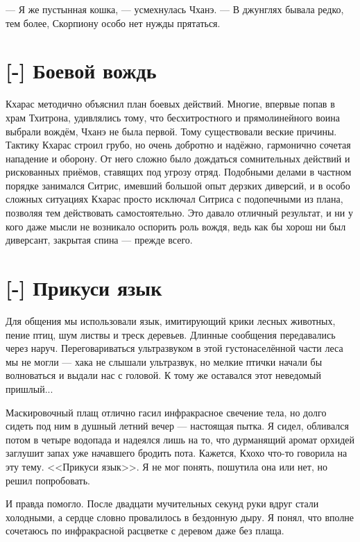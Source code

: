 --- Я же пустынная кошка, --- усмехнулась Чханэ.
--- В джунглях бывала редко, тем более, Скорпиону особо нет нужды прятаться.

\section{[-] Боевой вождь}

\textspace

Кхарас методично объяснил план боевых действий.
Многие, впервые попав в храм Тхитрона, удивлялись тому, что бесхитростного и прямолинейного воина выбрали вождём, Чханэ не была первой.
Тому существовали веские причины.
Тактику Кхарас строил грубо, но очень добротно и надёжно, гармонично сочетая нападение и оборону.
От него сложно было дождаться сомнительных действий и рискованных приёмов, ставящих под угрозу отряд.
Подобными делами в частном порядке занимался Ситрис, имевший большой опыт дерзких диверсий, и в особо сложных ситуациях Кхарас просто исключал Ситриса с подопечными из плана, позволяя тем действовать самостоятельно.
Это давало отличный результат, и ни у кого даже мысли не возникало оспорить роль вождя, ведь как бы хорош ни был диверсант, закрытая спина --- прежде всего.

\section{[-] Прикуси язык}

\textspace

Для общения мы использовали язык, имитирующий крики лесных животных, пение птиц, шум листвы и треск деревьев.
Длинные сообщения передавались через наруч.
Переговариваться ультразвуком в этой густонаселённой части леса мы не могли --- хака не слышали ультразвук, но мелкие птички начали бы волноваться и выдали нас с головой.
К тому же оставался этот неведомый пришлый...

Маскировочный плащ отлично гасил инфракрасное свечение тела, но долго сидеть под ним в душный летний вечер --- настоящая пытка.
Я сидел, обливался потом в четыре водопада и надеялся лишь на то, что дурманящий аромат орхидей заглушит запах уже начавшего бродить пота.
Кажется, Кхохо что-то говорила на эту тему.
<<Прикуси язык>>.
Я не мог понять, пошутила она или нет, но решил попробовать.

И правда помогло.
После двадцати мучительных секунд руки вдруг стали холодными, а сердце словно провалилось в бездонную дыру.
Я понял, что вполне сочетаюсь по инфракрасной расцветке с деревом даже без плаща.

